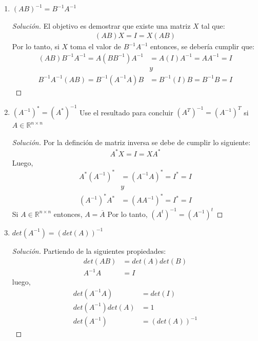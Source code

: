\documentclass[12pt]{book}
\newcommand{\R}{\mathbb{R}}
\newenvironment{solucion}
  {\renewcommand\qedsymbol{$\square$}\begin{proof}[Solución]}
  {\end{proof}}
\begin{document}
    \begin{enumerate}
        \item $(AB)^{-1}=B^{-1}A^{-1}$
        \begin{solucion}
            El objetivo es demostrar que existe una matriz $X$ tal que:
            \begin{align*}
                (AB)X=I=X(AB)
            \end{align*}
            Por lo tanto, si $X$ toma el valor de $B^{-1}A^{-1}$ entonces, se debería cumplir que:
            \begin{align*}
                (AB)B^{-1}A^{-1}=A(BB^{-1})A^{-1}&=A(I)A^{-1}=AA^{-1}=I\\ 
                &y\\
                B^{-1}A^{-1}(AB)=B^{-1}(A^{-1}A)B&=B^{-1}(I)B=B^{-1}B=I
            \end{align*}
        \end{solucion}
        \item $(A^{-1})^{*}=(A^{*})^{-1}$ Use el resultado para concluir $(A^{T})^{-1}=(A^{-1})^{T}$ si $A\in\R^{n\times n}$
        \begin{solucion}
            Por la definción de matriz inversa se debe de cumplir lo siguiente:
            \begin{align*}
                A^{*}X=I=XA^{*}
            \end{align*}
            Luego,
            \begin{align*}
                A^{*}(A^{-1})^{*}&=(A^{-1}A)^*=I^*=I\\ 
                &y\\
                (A^{-1})^{*}A^{*}&=(AA^{-1})^*=I^*=I
            \end{align*}
            Si $A\in\R^{n\times n}$ entonces, $A=\overline{A}$
            Por lo tanto, $(A^{t})^{-1}=(A^{-1})^{t}$
        \end{solucion}
        
        \item $det(A^{-1})=(det(A))^{-1}$
        \begin{solucion}
            Partiendo de la siguientes propiedades:
            \begin{align*}
                det(AB)&=det(A)det(B)\\
                A^{-1}A&=I
            \end{align*}
            luego,
            \begin{align*}
                det(A^{-1}A)&=det(I)\\
                det(A^{-1})det(A)&=1\\
                det(A^{-1})&=(det(A))^{-1}
            \end{align*}
        \end{solucion}
    \end{enumerate}
\end{document}
